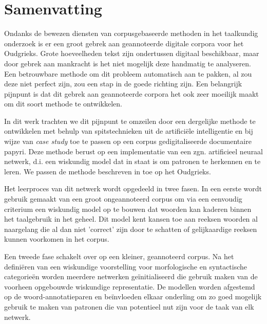 
\begingroup
\let\clearpage\relax
\let\cleardoublepage\relax
\let\cleardoublepage\relax



\chapter*{Samenvatting}

Ondanks de bewezen diensten van corpusgebaseerde methoden in het
taalkundig onderzoek is er een groot gebrek aan geannoteerde digitale
corpora voor het Oudgrieks. Grote hoeveelheden tekst zijn ondertussen
digitaal beschikbaar, maar door gebrek aan mankracht is het niet
mogelijk deze handmatig te analyseren. Een betrouwbare methode om dit
probleem automatisch aan te pakken, al zou deze niet perfect zijn, zou
een stap in de goede richting zijn. Een belangrijk pijnpunt is dat dit
gebrek aan geannoteerde corpora het ook zeer moeilijk maakt om dit
soort methode te ontwikkelen.

In dit werk trachten we dit pijnpunt te omzeilen door een dergelijke
methode te ontwikkelen met behulp van spitstechnieken uit de
artificiële intelligentie en bij wijze van \textit{case study} toe te
passen op een corpus gedigitaliseerde documentaire papyri. Deze
methode berust op een implementatie van een zgn. artificieel neuraal
netwerk, d.i. een wiskundig model dat in staat is om patronen te
herkennen en te leren. We passen de methode beschreven in
\cite{collobert-2011} toe op het Oudgrieks.

Het leerproces van dit netwerk wordt opgedeeld in twee fasen. In een
eerste wordt gebruik gemaakt van een groot ongeannoteerd corpus om via
een eenvoudig criterium een wiskundig model op te bouwen dat woorden
kan kaderen binnen het taalgebruik in het geheel.  Dit model kent
kansen toe aan reeksen woorden al naargelang die al dan niet 'correct'
zijn door te schatten of gelijkaardige reeksen kunnen voorkomen in het
corpus.

Een tweede fase schakelt over op een kleiner, geannoteerd corpus. Na
het defini\"eren van een wiskundige voorstelling voor morfologische en
syntactische categorie\"en worden meerdere netwerken ge\"initialiseerd
die gebruik maken van de voorheen opgebouwde wiskundige
representatie. De modellen worden afgestemd op de woord-annotatieparen
en be\"invloeden elkaar onderling om zo goed mogelijk gebruik te maken
van patronen die van potentieel nut zijn voor de taak van elk netwerk.


